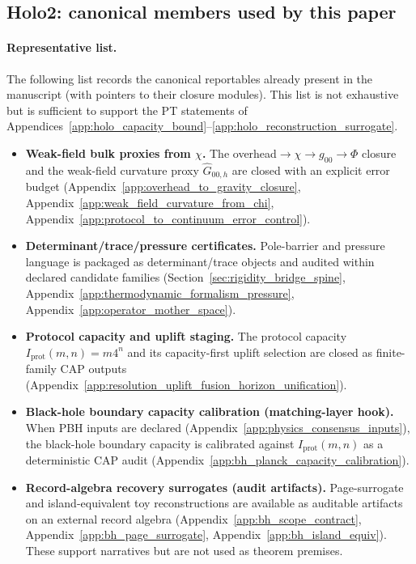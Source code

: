 \subsection{Holo2: canonical members used by this paper}
\label{subsec:holo2_registry_members}

\paragraph{Representative list.}
The following list records the canonical reportables already present in the manuscript
(with pointers to their closure modules). This list is not exhaustive but is sufficient to support the PT statements of
Appendices~\ref{app:holo_capacity_bound}--\ref{app:holo_reconstruction_surrogate}.

\begin{itemize}
\item \textbf{Weak-field bulk proxies from $\chi$.}
The overhead$\to\chi\to g_{00}\to\Phi$ closure and the weak-field curvature proxy
$\widehat G_{00,h}$ are closed with an explicit error budget
(Appendix~\ref{app:overhead_to_gravity_closure}, Appendix~\ref{app:weak_field_curvature_from_chi},
Appendix~\ref{app:protocol_to_continuum_error_control}).
\item \textbf{Determinant/trace/pressure certificates.}
Pole-barrier and pressure language is packaged as determinant/trace objects and audited within declared candidate families
(Section~\ref{sec:rigidity_bridge_spine}, Appendix~\ref{app:thermodynamic_formalism_pressure},
Appendix~\ref{app:operator_mother_space}).
\item \textbf{Protocol capacity and uplift staging.}
The protocol capacity $I_{\mathrm{prot}}(m,n)=m4^n$ and its capacity-first uplift selection are closed as finite-family CAP outputs
(Appendix~\ref{app:resolution_uplift_fusion_horizon_unification}).
\item \textbf{Black-hole boundary capacity calibration (matching-layer hook).}
When PBH inputs are declared (Appendix~\ref{app:physics_consensus_inputs}), the black-hole boundary capacity
is calibrated against $I_{\mathrm{prot}}(m,n)$ as a deterministic CAP audit
(Appendix~\ref{app:bh_planck_capacity_calibration}).
\item \textbf{Record-algebra recovery surrogates (audit artifacts).}
Page-surrogate and island-equivalent toy reconstructions are available as auditable artifacts on an external record algebra
(Appendix~\ref{app:bh_scope_contract}, Appendix~\ref{app:bh_page_surrogate}, Appendix~\ref{app:bh_island_equiv}).
These support \AuditTag narratives but are not used as theorem premises.
\end{itemize}

